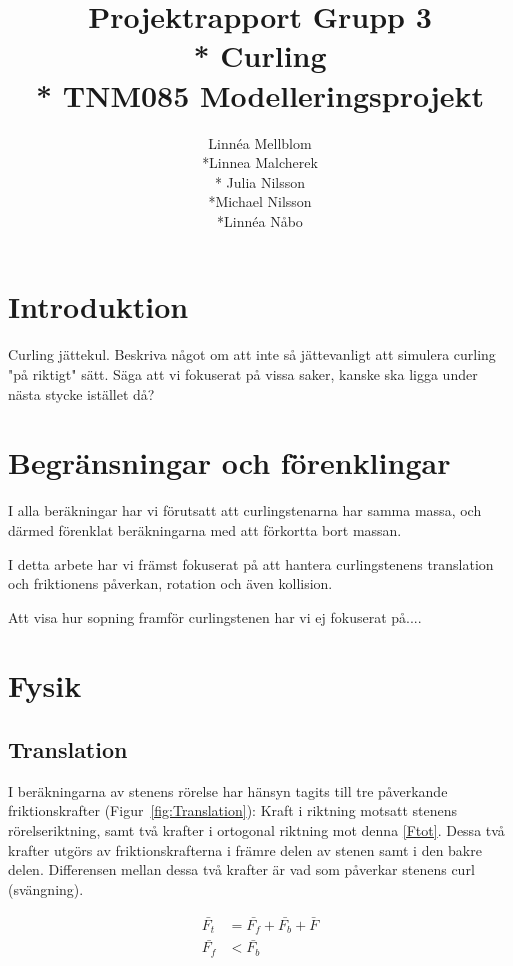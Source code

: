 \documentclass[11pt]{article} %
\title{Projektrapport Grupp 3 \\* 
Curling\\*
TNM085 Modelleringsprojekt}
\author{Linnéa Mellblom\\*Linnea Malcherek\\* Julia Nilsson\\*Michael Nilsson\\*Linnéa Nåbo}
\begin{document}
\maketitle
\pagebreak
{}  

\section{Introduktion}
Curling jättekul. Beskriva något om att inte så jättevanligt att simulera curling "på riktigt" sätt. Säga att vi fokuserat på vissa saker, kanske ska ligga under nästa stycke istället då? 

\section{Begränsningar och förenklingar} %
I alla beräkningar har vi förutsatt att curlingstenarna har samma massa, och därmed förenklat beräkningarna med att förkortta bort massan. 

I detta arbete har vi främst fokuserat på att hantera curlingstenens translation och friktionens påverkan, rotation och även kollision. 

Att visa hur sopning framför curlingstenen har vi ej fokuserat på....

\section{Fysik} %

\subsection{Translation}

I beräkningarna av stenens rörelse har hänsyn tagits till tre påverkande friktionskrafter (Figur~\ref{fig:Translation}): Kraft i riktning motsatt stenens rörelseriktning, samt två krafter i ortogonal riktning mot denna \eqref{Ftot}. Dessa två krafter utgörs av friktionskrafterna i främre delen av stenen samt i den bakre delen. Differensen mellan dessa två krafter är vad som påverkar stenens curl (svängning). 

 \begin{align}\label{Ftot}
 \bar{F_t}&=\bar{F_f}+\bar{F_b}+\bar{F}\\
 \bar{F_f}&<\bar{F_b}
 \end{align}
\end{document}
